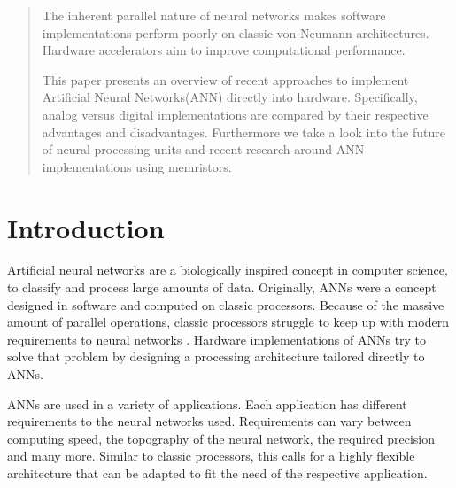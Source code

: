 \documentclass[conference]{IEEEtran}
\begin{document}
    \maketitle

    \begin{abstract}
        The inherent parallel nature of neural networks makes software implementations perform poorly on classic
        von-Neumann architectures.
        Hardware accelerators aim to improve computational performance.

        This paper presents an overview of recent approaches to implement Artificial Neural Networks(ANN) directly into hardware.
        Specifically, analog versus digital implementations are compared by their respective advantages and disadvantages.
        Furthermore we take a look into the future of neural processing units and recent research around ANN implementations using memristors.
    \end{abstract}





    \IEEEpeerreviewmaketitle



    \section{Introduction}

    Artificial neural networks are a biologically inspired concept in computer science, to classify and process large amounts of data.
    Originally, ANNs were a concept designed in software and computed on classic processors.
    Because of the massive amount of parallel operations, classic processors struggle to keep up with modern requirements to neural networks \cite{forssell2014hardware}.
    Hardware implementations of ANNs try to solve that problem by designing a processing architecture tailored directly to ANNs.

    ANNs are used in a variety of applications.
    Each application has different requirements to the neural networks used.
    Requirements can vary between computing speed, the topography of the neural network, the required precision and many more.
    Similar to classic processors, this calls for a highly flexible architecture that can be adapted to fit the need of the respective application.
\end{document}
